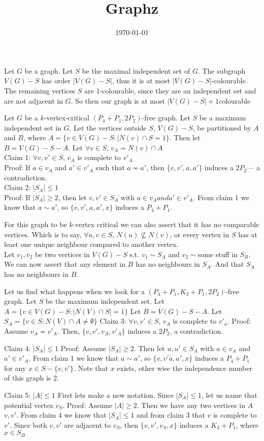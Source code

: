 \documentclass[12pt]{article}
\title{Graphz}
\date{\today}
\begin{document}
Let $G$ be a graph. Let $S$ be the maximal independent set of $G$. The subgraph $V(G) - S$ has order $|V(G) - S|$, thus it is at most $|V(G) - S|$-colourable. The remaining vertices $S$ are 1-colourable, since they are an independent set and are not adjacent in $G$. So then our graph is at most $|V(G) - S| + 1$colourable

Let $G$ be a $k$-vertex-critical $(P_4 + P_1, 2P_2)$-free graph. Let $S$ be a maximum independent set in $G$. Let the vertices outside $S$, $V(G) - S$, be partitioned by $A$ and $B$, where $A = \{v \in V(G) - S : |N(v) \cap S = 1\}$. Then let $B = V(G) - S - A$.
Let $\forall v \in S$, $v_A = N(v) \cap A$\\
Claim 1: $\forall v,v' \in S$, $v_A$ is complete to $v'_A$\\
Proof: If $a \in v_A$ and $a' \in v'_A$ such that $a \not \sim a'$, then $\{v, v', a, a'\}$ induces a $2P_2$--- a contradiction.\\
Claim 2: $|S_A| \leq 1$\\
Proof: If $|S_A| \geq 2$, then let $v, v' \in S_A$ with $a\in v_A and a' \in v'_A$. From claim 1 we know that $a \sim a'$, so $\{v, v', a, a', x\}$ induces a $P_4 + P_1$.

For this graph to be $k$-vertex critical we can also assert that it has no comparable vertices.
Which is to say, $\forall u, v \in S$, $N(u) \not \subseteq N(v)$, or every vertex in $S$ has at least one unique neighbour compared to another vertex.\\
Let $v_1, v_2$ be two vertices in $V(G) - S$ s.t. $v_1 \sim S_A$ and $v_2 \sim $some stuff in $S_B$.
We can now assert that any element in $B$ has no neighbours in $S_A$. And that $S_A$ has no neighbours in $B$.

Let us find what happens when we look for a $(P_4 + P_1, K_3 + P_1, 2P_2)$-free graph.
Let $S$ be the maximum independent set. Let $A = \{v \in V(G) - S : |N(V) \cap S| = 1\}$
Let $B = V(G) - S - A$.
Let $S_A = \{ v \in S : N(V) \cap A \not = \emptyset \}$
Claim 3: $\forall v, v' \in S$, $v_A$ is complete to $v'_a$.
Proof: Assume $v_A \not \sim v'_A$. Then, $\{ v, v', v_A, v'_A \}$ induces a $2P_2$, a contradiction.

Claim 4: $|S_A| \leq 1 $
Proof: Assume $|S_A| \geq 2$. Then let $u, u' \in S_A$ with $a \in v_A$ and $a' \in v'_A$. From claim 1 we know that $a \sim a'$, so $\{v, v' a, a', x\}$ induces a $P_4 + P_1$ for any $x \in S - \{v, v'\}$. Note that $x$ exists, other wise the independence number of this graph is 2.

Claim 5: $|A| \leq 1$
First lets make a new notation. Since $|S_A| \leq 1$, let us name that potential vertex $v_S$.
Proof: Assume $|A| \geq 2$. Then we have any two vertices in $A$ $v, v'$. From claim 4 we know that $|S_A| \leq 1$ and from claim 3 that $v$ is complete to $v'$. Since both $v, v'$ are adjacent to $v_S$, then  $\{v, v', v_S, x \}$ induces a $K_3 + P_1$, where $x \in S_B$
\end{document}
